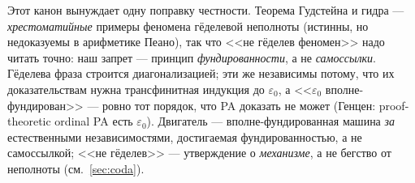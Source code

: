 \begin{remark}
Этот канон вынуждает одну поправку честности. Теорема Гудстейна и гидра --- \emph{хрестоматийные}
примеры феномена гёделевой неполноты (истинны, но недоказуемы в арифметике Пеано), так что <<не
гёделев феномен>> надо читать точно: наш запрет --- принцип \emph{фундированности}, а не
\emph{самоссылки}. Гёделева фраза строится диагонализацией; эти же независимы потому, что их
доказательствам нужна трансфинитная индукция до $\varepsilon_0$, а <<$\varepsilon_0$ вполне-фундирован>>
--- ровно тот порядок, что PA доказать не может (Генцен: proof-theoretic ordinal PA есть
$\varepsilon_0$). Двигатель --- вполне-фундированная машина \emph{за} естественными независимостями,
достигаемая фундированностью, а не самоссылкой; <<не гёделев>> --- утверждение о \emph{механизме}, а не
бегство от неполноты (см.\ \cref{sec:coda}).
\end{remark}
